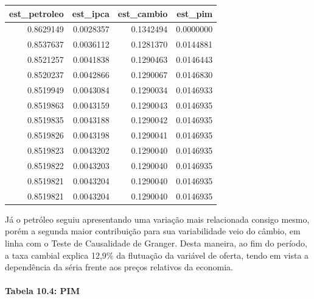 \documentclass[12pt]{article}
\begin{document}
\begin{longtable}[]{@{}rrrr@{}}
\toprule
est\_petroleo & est\_ipca & est\_cambio & est\_pim \\
\midrule
\endhead
0.8629149 & 0.0028357 & 0.1342494 & 0.0000000 \\
0.8537637 & 0.0036112 & 0.1281370 & 0.0144881 \\
0.8521257 & 0.0041838 & 0.1290463 & 0.0146443 \\
0.8520237 & 0.0042866 & 0.1290067 & 0.0146830 \\
0.8519949 & 0.0043084 & 0.1290034 & 0.0146933 \\
0.8519863 & 0.0043159 & 0.1290043 & 0.0146935 \\
0.8519835 & 0.0043188 & 0.1290042 & 0.0146935 \\
0.8519826 & 0.0043198 & 0.1290041 & 0.0146935 \\
0.8519823 & 0.0043202 & 0.1290040 & 0.0146935 \\
0.8519822 & 0.0043203 & 0.1290040 & 0.0146935 \\
0.8519821 & 0.0043204 & 0.1290040 & 0.0146935 \\
0.8519821 & 0.0043204 & 0.1290040 & 0.0146935 \\
\bottomrule
\end{longtable}

Já o petróleo seguiu apresentando uma variação mais relacionada consigo
mesmo, porém a segunda maior contribuição para sua variabilidade veio do
câmbio, em linha com o Teste de Causalidade de Granger. Desta maneira,
ao fim do período, a taxa cambial explica 12,9\% da flutuação da
variável de oferta, tendo em vista a dependência da séria frente aos
preços relativos da economia.

\hypertarget{tabela-10.4-pim}{%
\paragraph{Tabela 10.4: PIM}\label{tabela-10.4-pim}}
\end{document}
